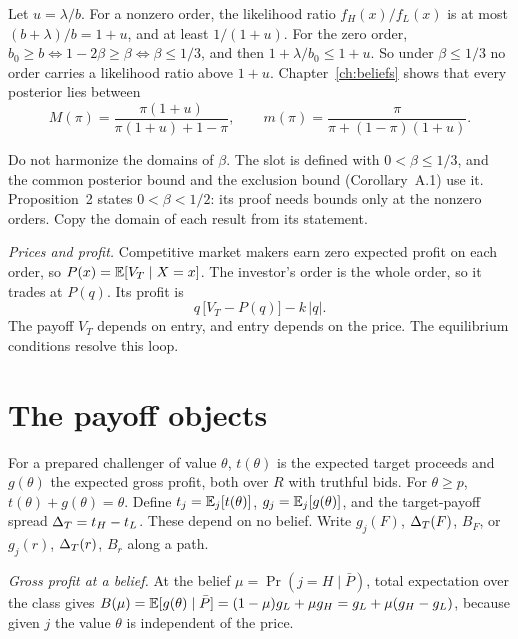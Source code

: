 Let \(u=\lambda/b\). For a nonzero order, the likelihood ratio \(f_H(x)/f_L(x)\) is at most \((b+\lambda)/b=1+u\), and at least \(1/(1+u)\).
For the zero order, \(b_0\ge b\iff1-2\beta\ge\beta\iff\beta\le1/3\), and then \(1+\lambda/b_0\le1+u\).
So under \(\beta\le1/3\) no order carries a likelihood ratio above \(1+u\).
Chapter~\ref{ch:beliefs} shows that every posterior lies between
\begin{equation}\label{eq:model-bounds}
M(\pi)=\frac{\pi(1+u)}{\pi(1+u)+1-\pi},\qquad
m(\pi)=\frac{\pi}{\pi+(1-\pi)(1+u)}.
\end{equation}

\begin{watchout}
Do not harmonize the domains of \(\beta\). The slot is defined with \(0<\beta\le1/3\), and the common posterior bound and the exclusion bound (Corollary~A.1) use it.
Proposition~2 states \(0<\beta<1/2\): its proof needs bounds only at the nonzero orders. Copy the domain of each result from its statement.
\end{watchout}

\emph{Prices and profit.} Competitive market makers earn zero expected profit on each order, so \(P(x)=\mathbb{E}[V_T\mid X=x]\).
The investor's order is the whole order, so it trades at \(P(q)\). Its profit is
\begin{equation}\label{eq:model-profit}
q\,\bigl[V_T-P(q)\bigr]-k\,|q|.
\end{equation}
The payoff \(V_T\) depends on entry, and entry depends on the price. The equilibrium conditions resolve this loop.

\section{The payoff objects}\label{sec:model-payoffs}

For a prepared challenger of value \(\theta\), \(t(\theta)\) is the expected target proceeds and \(g(\theta)\) the expected gross profit, both over \(R\) with truthful bids. For \(\theta\ge p\), \(t(\theta)+g(\theta)=\theta\).
Define \(t_j=\mathbb{E}_j[t(\theta)]\), \(g_j=\mathbb{E}_j[g(\theta)]\), and the target-payoff spread \(\Delta_T=t_H-t_L\).
These depend on no belief. Write \(g_j(F)\), \(\Delta_T(F)\), \(B_F\), or \(g_j(r)\), \(\Delta_T(r)\), \(B_r\) along a path.

\emph{Gross profit at a belief.} At the belief \(\mu=\Pr(j=H\mid\bar P)\), total expectation over the class gives \(B(\mu)=\mathbb{E}[g(\theta)\mid\bar P]=(1-\mu)g_L+\mu g_H=g_L+\mu(g_H-g_L)\), because given \(j\) the value \(\theta\) is independent of the price.

